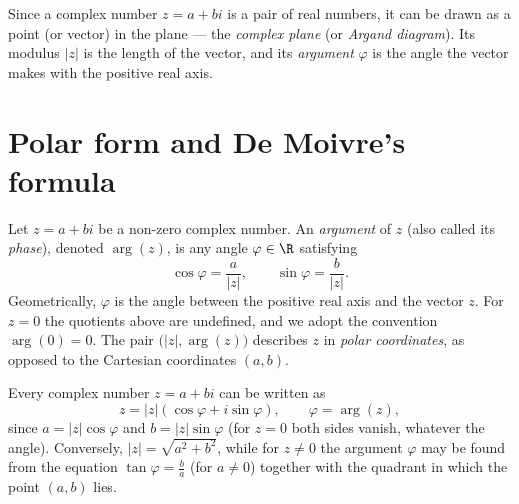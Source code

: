 Since a complex number $z=a+bi$ is a pair of real numbers, it can be drawn as a point (or vector) in the
plane — the \emph{complex plane} (or \emph{Argand diagram}). Its modulus $|z|$ is the length of the vector,
and its \emph{argument} $\varphi$ is the angle the vector makes with the positive real axis.

\begin{center}
\end{center}

\section{Polar form and De Moivre's formula}

\begin{definition}
Let $z=a+bi$ be a non-zero complex number. An \emph{argument} of $z$ (also called its \emph{phase}), denoted
$\arg(z)$, is any angle $\varphi\in\R$ satisfying
\[
\cos\varphi = \frac{a}{|z|}, \qquad \sin\varphi = \frac{b}{|z|}.
\]
Geometrically, $\varphi$ is the angle between the positive real axis and the vector $z$. For $z=0$ the
quotients above are undefined, and we adopt the convention $\arg(0)=0$. The pair $\big(|z|,\arg(z)\big)$
describes $z$ in \emph{polar coordinates}, as opposed to the Cartesian coordinates $(a,b)$.
\end{definition}

\begin{theorem}
Every complex number $z=a+bi$ can be written as
\[
z=|z|\left(\cos \varphi + i\sin \varphi \right), \qquad \varphi = \arg(z),
\]
since $a = |z|\cos\varphi$ and $b = |z|\sin\varphi$ (for $z=0$ both sides vanish, whatever the angle).
Conversely, $|z| = \sqrt{a^2+b^2}$, while for $z\neq 0$ the argument $\varphi$ may be found from the equation
$\tan\varphi= \tfrac{b}{a}$ (for $a \neq 0$) together with the quadrant in which the point $(a,b)$ lies.
\end{theorem}

